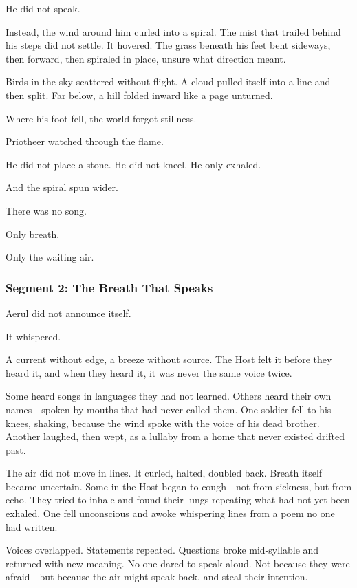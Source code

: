\documentclass[9pt]{article}
\begin{document}
He did not speak.

Instead, the wind around him curled into a spiral. The mist that trailed behind his steps did not settle. It hovered. The grass beneath his feet bent sideways, then forward, then spiraled in place, unsure what direction meant.

Birds in the sky scattered without flight. A cloud pulled itself into a line and then split. Far below, a hill folded inward like a page unturned.

Where his foot fell, the world forgot stillness.

Priotheer watched through the flame.

He did not place a stone. He did not kneel. He only exhaled.

And the spiral spun wider.

There was no song.

Only breath.

Only the waiting air.


\newpage

\subsubsection*{Segment 2: The Breath That Speaks}

Aerul did not announce itself.

It whispered.

A current without edge, a breeze without source. The Host felt it before they heard it, and when they heard it, it was never the same voice twice.

Some heard songs in languages they had not learned. Others heard their own names—spoken by mouths that had never called them. One soldier fell to his knees, shaking, because the wind spoke with the voice of his dead brother. Another laughed, then wept, as a lullaby from a home that never existed drifted past.

The air did not move in lines. It curled, halted, doubled back. Breath itself became uncertain. Some in the Host began to cough—not from sickness, but from echo. They tried to inhale and found their lungs repeating what had not yet been exhaled. One fell unconscious and awoke whispering lines from a poem no one had written.

Voices overlapped. Statements repeated. Questions broke mid-syllable and returned with new meaning. No one dared to speak aloud. Not because they were afraid—but because the air might speak back, and steal their intention.
\end{document}
